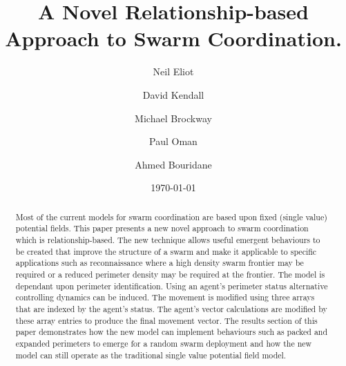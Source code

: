 \documentclass[12pt,a4paper]{IEEEtran}
\title{A Novel Relationship-based Approach to Swarm Coordination.}
\author[*]{Neil Eliot}
\author[ ]{David Kendall}
\author[ ]{Michael Brockway}
\author[ ]{Paul Oman}
\author[ ]{Ahmed Bouridane}
\affil[ ] {Department of Computer Sciences, Northumbria University}
\affil[*] {Corresponding author: Dr Neil Eliot, neil.eliot@northumbria.ac.uk}
\date{\today}
\begin{document}
\maketitle

\begin{abstract}
Most of the current models for swarm coordination are based upon fixed (single value) potential fields. This paper presents a new novel approach to swarm coordination which is relationship-based. The new technique allows useful emergent behaviours to be created that improve the structure of a swarm and make it applicable to specific applications such as reconnaissance where a high density swarm frontier may be required or a reduced perimeter density may be required at the frontier. The model is dependant upon perimeter identification. Using an agent's perimeter status alternative controlling dynamics can be induced. The movement is modified using three arrays that are indexed by the agent's status. The agent's vector calculations are modified by these array entries to produce the final movement vector. The results section of this paper demonstrates how the new model can implement behaviours such as packed and expanded perimeters to emerge for a random swarm deployment and how the new model can still operate as the traditional single value potential field model.
\end{abstract}
\end{document}
